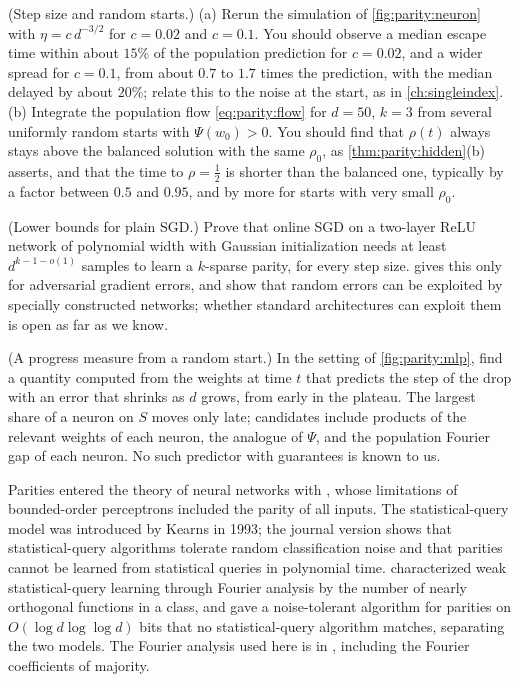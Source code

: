 \begin{refsection}
\begin{exercises}
\item \simulation (Step size and random starts.) (a) Rerun the simulation of \cref{fig:parity:neuron} with $\eta=c\,d^{-3/2}$ for $c=0.02$ and $c=0.1$. You should observe a median escape time within about $15\%$ of the population prediction for $c=0.02$, and a wider spread for $c=0.1$, from about $0.7$ to $1.7$ times the prediction, with the median delayed by about $20\%$; relate this to the noise at the start, as in \cref{ch:singleindex}. (b) Integrate the population flow \eqref{eq:parity:flow} for $d=50$, $k=3$ from several uniformly random starts with $\Psi(w_0)>0$. You should find that $\rho(t)$ always stays above the balanced solution with the same $\rho_0$, as \cref{thm:parity:hidden}(b) asserts, and that the time to $\rho=\frac12$ is shorter than the balanced one, typically by a factor between $0.5$ and $0.95$, and by more for starts with very small $\rho_0$.\label{ex:parity:stepsize}

\item \research (Lower bounds for plain SGD.) Prove that online SGD on a two-layer ReLU network of polynomial width with Gaussian initialization needs at least $d^{k-1-o(1)}$ samples to learn a $k$-sparse parity, for every step size.  gives this only for adversarial gradient errors, and \textcite{AbbeSandon2020} show that random errors can be exploited by specially constructed networks; whether standard architectures can exploit them is open as far as we know.\label{ex:parity:sgdlower}

\item \research (A progress measure from a random start.) In the setting of \cref{fig:parity:mlp}, find a quantity computed from the weights at time $t$ that predicts the step of the drop with an error that shrinks as $d$ grows, from early in the plateau. The largest share of a neuron on $S$ moves only late; candidates include products of the relevant weights of each neuron, the analogue of $\Psi$, and the population Fourier gap of each neuron. No such predictor with guarantees is known to us.\label{ex:parity:measure}
\end{exercises}

\notesandrefs
Parities entered the theory of neural networks with \textcite{MinskyPapert1969}, whose limitations of bounded-order perceptrons included the parity of all inputs. The statistical-query model was introduced by Kearns in 1993; the journal version \parencite{Kearns1998} shows that statistical-query algorithms tolerate random classification noise and that parities cannot be learned from statistical queries in polynomial time. \Textcite{BlumEtAl1994} characterized weak statistical-query learning through Fourier analysis by the number of nearly orthogonal functions in a class, and \textcite{BlumKalaiWasserman2003} gave a noise-tolerant algorithm for parities on $O(\log d\log\log d)$ bits that no statistical-query algorithm matches, separating the two models. The Fourier analysis used here is in \textcite{ODonnell2014}, including the Fourier coefficients of majority.


\end{refsection}
